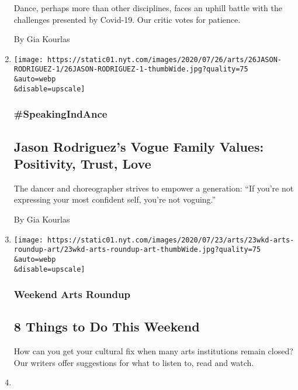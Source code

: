 \begin{enumerate}
  Dance, perhaps more than other disciplines, faces an uphill battle
  with the challenges presented by Covid-19. Our critic votes for
  patience.

  By Gia Kourlas
\item
  \href{/2020/07/24/arts/dance/jason-rodriguez-vogue-pose.html}{}

  \texttt{[image: https://static01.nyt.com/images/2020/07/26/arts/26JASON-RODRIGUEZ-1/26JASON-RODRIGUEZ-1-thumbWide.jpg?quality=75\\\&auto=webp\\\&disable=upscale]}

  \hypertarget{speakingindance-1}{%
  \subsubsection{\#SpeakingIndAnce}\label{speakingindance-1}}

  \hypertarget{jason-rodriguezs-vogue-family-values-positivity-trust-love}{%
  \subsection{Jason Rodriguez's Vogue Family Values: Positivity, Trust,
  Love}\label{jason-rodriguezs-vogue-family-values-positivity-trust-love}}

  The dancer and choreographer strives to empower a generation: ``If
  you're not expressing your most confident self, you're not voguing.''

  By Gia Kourlas
\item
  \href{/2020/07/23/arts/things-to-do-weekend-coronavirus.html}{}

  \texttt{[image: https://static01.nyt.com/images/2020/07/23/arts/23wkd-arts-roundup-art/23wkd-arts-roundup-art-thumbWide.jpg?quality=75\\\&auto=webp\\\&disable=upscale]}

  \hypertarget{weekend-arts-roundup}{%
  \subsubsection{Weekend Arts Roundup}\label{weekend-arts-roundup}}

  \hypertarget{8-things-to-do-this-weekend}{%
  \subsection{8 Things to Do This
  Weekend}\label{8-things-to-do-this-weekend}}

  How can you get your cultural fix when many arts institutions remain
  closed? Our writers offer suggestions for what to listen to, read and
  watch.
\item
  \href{/2020/07/21/arts/dance/ayodele-casel-diary-of-a-tap-dancer.html}{}


\end{enumerate}
